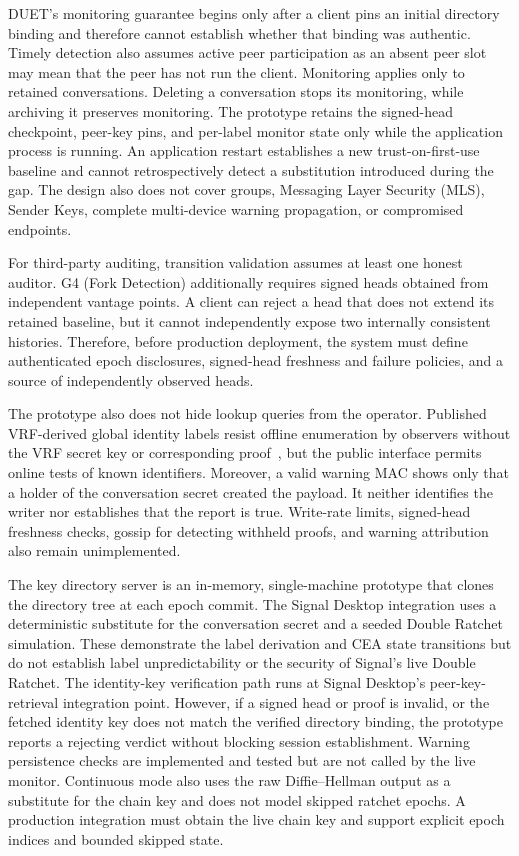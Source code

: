 DUET's monitoring guarantee begins only after a client pins an initial directory binding and
therefore cannot establish whether that binding was authentic. Timely detection also assumes active
peer participation as an absent peer slot may mean that the peer has not run the client. Monitoring
applies only to retained conversations. Deleting a conversation stops its monitoring, while
archiving it preserves monitoring. The prototype retains the signed-head checkpoint, peer-key pins,
and per-label monitor state only while the application process is running. An application restart
establishes a new trust-on-first-use baseline and cannot retrospectively detect a substitution
introduced during the gap. The design also does not cover groups, Messaging Layer Security (MLS),
Sender Keys, complete multi-device warning propagation, or compromised endpoints.

For third-party auditing, transition validation assumes at least one honest auditor. G4 (Fork
Detection) additionally requires signed heads obtained from independent vantage points. A client can
reject a head that does not extend its retained baseline, but it cannot independently expose two
internally consistent histories. Therefore, before production deployment, the system must define
authenticated epoch disclosures, signed-head freshness and failure policies, and a source of
independently observed heads.

The prototype also does not hide lookup queries from the operator. Published VRF-derived global
identity labels resist offline enumeration by observers without the VRF secret key or corresponding
proof~\cite[Sections~1, 3.4, and 7.6]{rfc9381}, but the public interface permits online tests of
known identifiers. Moreover, a valid warning MAC shows only that a holder of the conversation
secret created the payload. It neither identifies the writer nor establishes that the report is
true. Write-rate limits, signed-head freshness checks, gossip for detecting withheld proofs, and
warning attribution also remain unimplemented.

The key directory server is an in-memory, single-machine prototype that
clones the directory tree at each epoch commit. The Signal Desktop integration uses a deterministic
substitute for the conversation secret and a seeded Double Ratchet simulation. These demonstrate
the label derivation and CEA state transitions but do not establish label unpredictability or the
security of Signal's live Double Ratchet. The identity-key verification path runs at Signal
Desktop's peer-key-retrieval integration point. However, if a signed head or proof is invalid, or the fetched
identity key does not match the verified directory binding, the prototype reports a rejecting
verdict without blocking session establishment. Warning persistence checks are implemented and
tested but are not called by the live monitor. Continuous mode also uses the raw Diffie--Hellman
output as a substitute for the chain key and does not model skipped ratchet epochs. A production
integration must obtain the live chain key and support explicit epoch indices and bounded skipped
state.

